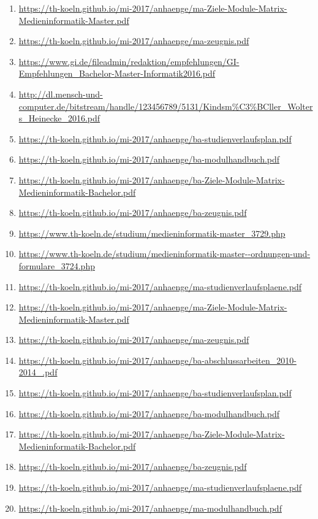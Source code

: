 \documentclass[BCOR12mm,DIV11,titlepage,a4paper,oneside,10pt]{scrbook}
\begin{document}
\begin{sloppypar}
\begin{flushleft}
\begin{enumerate}
\item{\url{https://th-koeln.github.io/mi-2017/anhaenge/ma-Ziele-Module-Matrix-Medieninformatik-Master.pdf}} 
\item{\url{https://th-koeln.github.io/mi-2017/anhaenge/ma-zeugnis.pdf}} 
\item{\url{https://www.gi.de/fileadmin/redaktion/empfehlungen/GI-Empfehlungen\_Bachelor-Master-Informatik2016.pdf}} 
\item{\url{http://dl.mensch-und-computer.de/bitstream/handle/123456789/5131/Kindsm\%C3\%BCller\_Wolters\_Heinecke\_2016.pdf}} 
\item{\url{https://th-koeln.github.io/mi-2017/anhaenge/ba-studienverlaufsplan.pdf}} 
\item{\url{https://th-koeln.github.io/mi-2017/anhaenge/ba-modulhandbuch.pdf}} 
\item{\url{https://th-koeln.github.io/mi-2017/anhaenge/ba-Ziele-Module-Matrix-Medieninformatik-Bachelor.pdf}} 
\item{\url{https://th-koeln.github.io/mi-2017/anhaenge/ba-zeugnis.pdf}} 
\item{\url{https://www.th-koeln.de/studium/medieninformatik-master\_3729.php}} 
\item{\url{https://www.th-koeln.de/studium/medieninformatik-master--ordnungen-und-formulare\_3724.php}} 
\item{\url{https://th-koeln.github.io/mi-2017/anhaenge/ma-studienverlaufsplaene.pdf}} 
\item{\url{https://th-koeln.github.io/mi-2017/anhaenge/ma-Ziele-Module-Matrix-Medieninformatik-Master.pdf}} 
\item{\url{https://th-koeln.github.io/mi-2017/anhaenge/ma-zeugnis.pdf}} 
\item{\url{https://th-koeln.github.io/mi-2017/anhaenge/ba-abschlussarbeiten\_2010-2014\_.pdf}} 
\item{\url{https://th-koeln.github.io/mi-2017/anhaenge/ba-studienverlaufsplan.pdf}} 
\item{\url{https://th-koeln.github.io/mi-2017/anhaenge/ba-modulhandbuch.pdf}} 
\item{\url{https://th-koeln.github.io/mi-2017/anhaenge/ba-Ziele-Module-Matrix-Medieninformatik-Bachelor.pdf}} 
\item{\url{https://th-koeln.github.io/mi-2017/anhaenge/ba-zeugnis.pdf}} 
\item{\url{https://th-koeln.github.io/mi-2017/anhaenge/ma-studienverlaufsplaene.pdf}} 
\item{\url{https://th-koeln.github.io/mi-2017/anhaenge/ma-modulhandbuch.pdf}} 

\end{enumerate}
\end{flushleft}
\end{sloppypar}
\end{document}
